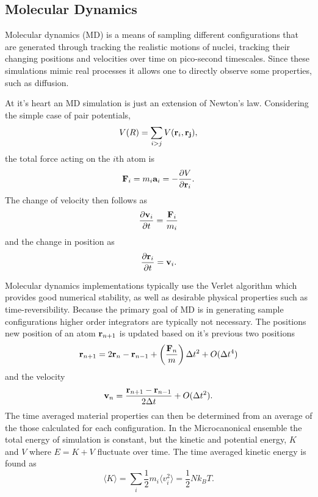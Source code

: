 \subsection{Molecular Dynamics}

Molecular dynamics (MD) is a means of sampling different configurations that are
generated through tracking the realistic motions of nuclei, tracking their changing
positions and velocities over time on pico-second timescales. Since these simulations
mimic real processes it allows one to directly observe some properties, such as
diffusion.

At it's heart an MD simulation is just an extension of Newton's law. Considering the
simple case of pair potentials, 
%
\begin{equation}
    V(R) = \sum_{i>j} V({\bf r}_i,{\bf r_j}),
\end{equation}
%
the total force acting on the $i$th atom is
%
\begin{equation}
    {\bf F}_i = m_i{\bf a}_i = - \frac{\partial V}{\partial {\bf r}_i}.
\end{equation}
%
The change of velocity then follows as 
%
\begin{equation}
    \frac{\partial {\bf v}_i}{\partial t} = \frac{ {\bf F}_i}{m_i}
\end{equation}
%
and the change in position as 
%
\begin{equation}
    \frac{\partial {\bf r}_i}{\partial t} = {\bf v}_i.
\end{equation}
%

Molecular dynamics implementations typically use the Verlet algorithm
\citep{Verlet1967} which provides good numerical stability, as well as desirable
physical properties such as time-reversibility. Because the primary goal of MD is in
generating sample configurations higher order integrators are typically not
necessary. The positions new position of an atom  ${\bf r}_{n+1}$ is updated based on it's
previous two positions
%
\begin{equation}
    {\bf r}_{n+1} = 2{\bf r}_{n} - {\bf r}_{n-1} + \left(\frac{ {\bf F}_n }{m}
    \right) \Delta t^2 + O(\Delta t^4)
\end{equation}
%
and the velocity
%
\begin{equation}
    {\bf v}_{n} = \frac{{\bf r}_{n+1} - {\bf r}_{n-1}}{2\Delta t}  + O(\Delta t^2).
\end{equation}
%
The time averaged material properties can then be determined from an
average of the those calculated for each configuration. In the Microcanonical
ensemble the total energy of simulation is constant, but the kinetic and potential
energy, $K$ and $V$ where $E=K+V$ fluctuate over time. The time averaged kinetic
energy is found as 
%
\begin{equation}
    \langle K \rangle = \sum_i \frac{1}{2}m_i\langle  v_i^2 \rangle =
    \frac{1}{2}Nk_BT.
\end{equation}

